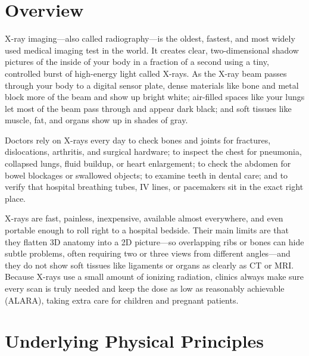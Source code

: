 \label{ch:infographic-xray}

\section{Overview}

X-ray imaging---also called radiography---is the oldest, fastest, and most widely used medical imaging test in the world. It creates clear, two-dimensional shadow pictures of the inside of your body in a fraction of a second using a tiny, controlled burst of high-energy light called X-rays. As the X-ray beam passes through your body to a digital sensor plate, dense materials like bone and metal block more of the beam and show up bright white; air-filled spaces like your lungs let most of the beam pass through and appear dark black; and soft tissues like muscle, fat, and organs show up in shades of gray.

Doctors rely on X-rays every day to check bones and joints for fractures, dislocations, arthritis, and surgical hardware; to inspect the chest for pneumonia, collapsed lungs, fluid buildup, or heart enlargement; to check the abdomen for bowel blockages or swallowed objects; to examine teeth in dental care; and to verify that hospital breathing tubes, IV lines, or pacemakers sit in the exact right place.

X-rays are fast, painless, inexpensive, available almost everywhere, and even portable enough to roll right to a hospital bedside. Their main limits are that they flatten 3D anatomy into a 2D picture---so overlapping ribs or bones can hide subtle problems, often requiring two or three views from different angles---and they do not show soft tissues like ligaments or organs as clearly as CT or MRI. Because X-rays use a small amount of ionizing radiation, clinics always make sure every scan is truly needed and keep the dose as low as reasonably achievable (ALARA), taking extra care for children and pregnant patients.

\section{Underlying Physical Principles}

